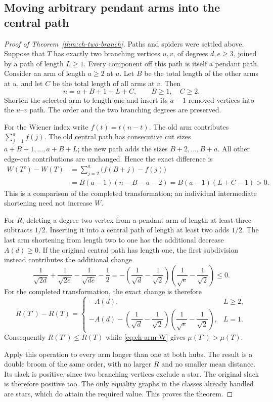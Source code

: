 \documentclass[11pt,a4paper]{article}
\theoremstyle{remark}\newtheorem{remark}[theorem]{Remark}
\begin{document}
\subsection{Moving arbitrary pendant arms into the central path}
\begin{proof}[Proof of Theorem~\ref{thm:ch-two-branch}]
Paths and spiders were settled above. Suppose that $T$ has exactly two
branching vertices $u,v$, of degrees $d,e\ge3$, joined by a path of length
$L\ge1$. Every component off this path is itself a pendant path.
Consider an arm of length $a\ge2$ at $u$. Let $B$ be the total length
of the other arms at $u$, and let $C$ be the total length of all arms at
$v$. Then
\[
 n=a+B+1+L+C,\qquad B\ge1,\quad C\ge2.
\]
Shorten the selected arm to length one and insert its $a-1$ removed
vertices into the $u$--$v$ path. The order and the two branching degrees
are preserved.

For the Wiener index write $f(t)=t(n-t)$. The old arm contributes
$\sum_{j=1}^a f(j)$. The old central path has consecutive cut sizes
$a+B+1,\ldots,a+B+L$; the new path adds the sizes $B+2,\ldots,B+a$.
All other edge-cut contributions are unchanged. Hence the exact difference is
\begin{align}
 W(T')-W(T)
 &=\sum_{j=2}^a\bigl(f(B+j)-f(j)\bigr)\nonumber\\
 &=B(a-1)(n-B-a-2)
   =B(a-1)(L+C-1)>0.\label{eq:ch-arm-W}
\end{align}
This is a comparison of the completed transformation; an individual
intermediate shortening need not increase $W$.

For $R$, deleting a degree-two vertex from a pendant arm of length at
least three subtracts $1/2$. Inserting it into a central path of length
at least two adds $1/2$. The last arm shortening from length two to one
has the additional decrease $A(d)\ge0$. If the original central path
has length one, the first subdivision instead contributes the additional
change
\[
 \frac1{\sqrt{2d}}+\frac1{\sqrt{2e}}
       -\frac1{\sqrt{de}}-\frac12
 =-\left(\frac1{\sqrt d}-\frac1{\sqrt2}\right)
    \left(\frac1{\sqrt e}-\frac1{\sqrt2}\right)\le0.
\]
For the completed transformation, the exact change is therefore
\[
 R(T')-R(T)=
 \begin{cases}
  -A(d),&L\ge2,\\[2pt]
  -A(d)-\left(\dfrac1{\sqrt d}-\dfrac1{\sqrt2}\right)
          \left(\dfrac1{\sqrt e}-\dfrac1{\sqrt2}\right),&L=1.
 \end{cases}
\]
Consequently $R(T')\le R(T)$ while \eqref{eq:ch-arm-W} gives
$\mu(T')>\mu(T)$.

Apply this operation to every arm longer than one at both hubs. The
result is a double broom of the same order, with no larger $R$ and no
smaller mean distance. Its slack is positive, since two branching
vertices exclude a star. The original slack is therefore positive too.
The only equality graphs in the classes already handled are stars,
which do attain the required value. This proves the theorem.
\end{proof}
\end{document}
